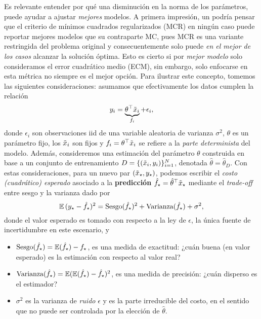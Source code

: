 Es relevante entender por qué una disminución en la norma de los parámetros, puede ayudar a ajustar \emph{mejores} modelos. A primera impresión, un podría pensar que el criterio de mínimos cuadrados regularizados (MCR) en ningún caso puede reportar mejores modelos que su contraparte MC, pues MCR es una variante restringida del problema original y consecuentemente solo puede \emph{en el mejor de los casos} alcanzar la solución óptima. Esto es cierto si por \emph{mejor modelo} solo consideramos el error cuadrático medio (ECM), sin embargo, solo enfocarse en esta métrica no siempre es el mejor opción. Para ilustrar este concepto, tomemos las siguientes consideraciones: asumamos que efectivamente los datos cumplen la relación
\begin{equation}
	y_i = \underbrace{\theta^\top\tilde{x}_i}_{f_i} + \epsilon_i,	
 \end{equation}
 donde $\epsilon_i$ son observaciones iid de una variable aleatoria de varianza $\sigma^2$, $\theta$ es un parámetro fijo, los $\tilde{x}_i$ son fijos y $f_i= \theta^\top\tilde{x}_i$ se refiere a la  \emph{parte determinista} del modelo. Además, consideremos una estimación del parámetro $\theta$ construida en base a un conjunto de entrenamiento $D=\{(\tilde{x}_i,y_i)\}_{i=1}^N$, denotada $\hat\theta=\hat\theta_D$. Con estas consideraciones, para un nuevo par $(\tilde{x}_\star,y_\star)$, podemos escribir el \emph{costo (cuadrático) esperado} asociado a la \textbf{predicción} $\hat f_\star = \hat\theta^\top \tilde{x}_\star$ mediante el \emph{trade-off} entre sesgo y la varianza \cite{ISLbook} dado por
\begin{equation}
 	\operatorname{\mathbb{E}}{(y_\star - \hat f_\star)^2} = \text{Sesgo}(\hat f_\star)^2 + \text{Varianza}(\hat f_\star) + \sigma^2,\label{eq:expected_sq_loss}
 \end{equation} 
 donde el valor esperado es tomado con respecto a la ley de $\epsilon$, la única fuente de incertidumbre en este escenario, y 
 \begin{itemize}
 	\item $\text{Sesgo}(\hat f_\star) = \operatorname{\mathbb{E}}(\hat f_\star) - f_\star$, es una medida de exactitud: ¿cuán buena (en valor esperado) es la estimación con respecto al valor real?
 	\item $\text{Varianza}(\hat f_\star)= \operatorname{\mathbb{E}}(\operatorname{\mathbb{E}}(\hat f_\star)- \hat f_\star)^2$, es una medida de precisión: ¿cuán disperso es el estimador?
 	\item $\sigma^2$ es la varianza de \emph{ruido} $\epsilon$ y es la parte irreducible del costo, en el sentido que no puede ser controlada por la elección de $\hat\theta$.
 \end{itemize}

